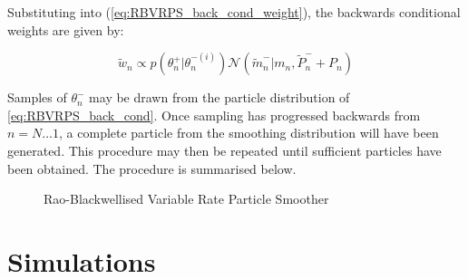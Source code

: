 \documentclass[journal]{IEEEtran}
\begin{document}
Substituting into (\ref{eq:RBVRPS_back_cond_weight}), the backwards conditional weights are given by:

\begin{equation}
 \tilde{w}_n \propto p(\theta_{n}^+|\theta_{n}^{-(i)}) \mathcal{N}(\tilde{m}_n^-|m_n, \tilde{P}_n^- + P_n)
\label{eq:RBVRPS_back_cond_weight2}
\end{equation}

Samples of $\theta_{n}^-$ may be drawn from the particle distribution of \ref{eq:RBVRPS_back_cond}. Once sampling has progressed backwards from $n=N \dots 1$, a complete particle from the smoothing distribution will have been generated. This procedure may then be repeated until sufficient particles have been obtained. The procedure is summarised below.%

\begin{figure}
\caption{Rao-Blackwellised Variable Rate Particle Smoother}
\label{alg:RBVRPS}
\end{figure}



\section{Simulations} \label{sec:simulations}
\end{document}
